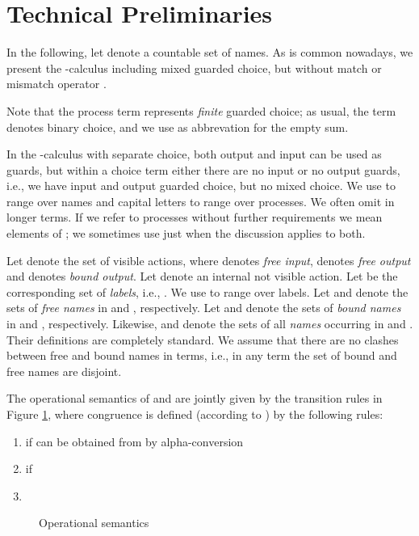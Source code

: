 \documentclass[11pt,techReport]{eptcs}
\begin{document}
\section{Technical Preliminaries} \label{sec:techn-prel}

In the following, let  denote a countable set of names. As is common nowadays, we present the -calculus including mixed guarded choice, but without match or mismatch operator \cite{sangiorgiWalker01, palamidessi03}.

\noindent
Note that the process term  represents \emph{finite} guarded choice; as usual, the term  denotes binary choice,  and we use  as abbrevation for the empty sum.

In the -calculus with separate choice, both output and input can be used as guards, but within a choice term either there are no input or no output guards, i.e., we have input and output guarded choice, but no mixed choice.
We use  to range over names and capital letters  to range over processes. We often omit  in longer terms. If we refer to processes without further requirements we mean elements of \procmix; we sometimes use just  when the discussion applies to both.

Let  denote the set of visible actions, where  denotes \emph{free input},  denotes \emph{free output} and  denotes \emph{bound output}. Let  denote an internal not visible action. Let  be the corresponding set of \emph{labels}, i.e., . We use  to range over labels. Let  and   denote the sets of \emph{free names} in  and , respectively. Let  and  denote the sets of \emph{bound names} in  and , respectively. Likewise,   and  denote the sets of all \emph{names} occurring in  and . Their definitions are completely standard. We assume that there are no clashes between free and bound names in terms, i.e., in any term the set of bound and free names are disjoint.

The operational semantics of \procmix and \procsep are jointly given by the transition rules in Figure \ref{fig:operationalSemantics}, where congruence  is defined (according to \cite{palamidessi03}) by the following rules:
\begin{enumerate}
	\item  if  can be obtained from  by alpha-conversion
	\item  if 
	\item 
\end{enumerate}
\begin{figure}[ht]
	
	\caption{Operational semantics} \label{fig:operationalSemantics}
\end{figure}
\end{document}
